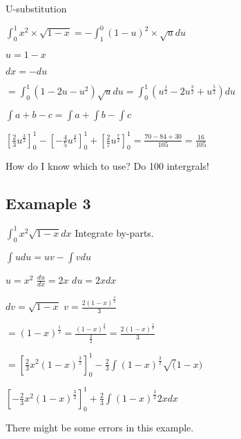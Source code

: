 \documentclass[12pt,a4paper]{article}
\begin{document}
U-substitution

\noindent $\int_{0}^{1} x^2 \times \sqrt{1 - x} = - \int_{1}^{0} (1 - u)^2 \times \sqrt{u} du$

\noindent $\boxed{u = 1 - x}$

\noindent $\boxed{dx = -du}$

\noindent $= \int_{0}^{1} (1-2u-u^2)\sqrt{u} du = \int_{0}^{1} (u^\frac{1}{2} - 2u^\frac{3}{2} + u^\frac{5}{2}) du$

\noindent $\int a + b - c = \int a + \int b - \int c$

\noindent $[\frac{2}{3}u^\frac{3}{2}]_{0}^{1} - [-\frac{4}{5}u^\frac{4}{5}]_{0}^{1} + [\frac{2}{7} u^\frac{7}{2}]_{0}^{1} = \frac{70 - 84 + 30}{105} = \boxed{\frac{16}{105}}$
\newline

\noindent How do I know which to use? Do 100 intergrals!

\newpage

\subsection*{Examaple 3}

$\int_{0}^{1} x^2 \sqrt{1 - x} dx$ Integrate by-parts.

\noindent $\boxed{\int u du = uv - \int v du}$

\noindent $u = x^2$ $\frac{du}{dx} = 2x$ $du = 2xdx$

\noindent $dv = \sqrt{1 - x}$ $v = \frac{2(1-x)^\frac{3}{2}}{3}$

\noindent $=(1-x)^\frac{1}{2} = \frac{(1-x)^\frac{3}{2}}{\frac{3}{2}} = \frac{2(1-x)^\frac{3}{2}}{3}$

\noindent $=[\frac{2}{3} x^2 (1-x)^\frac{3}{2}]_{0}^{1} - \frac{2}{3} \int (1 - x)^\frac{3}{2} \sqrt(1-x)$

\noindent $[-\frac{2}{3} x^2 (1 - x)^\frac{3}{2}]_{0}^{1} + \frac{2}{3} \int (1-x)^\frac{3}{2} 2x dx$
\newline

\noindent There might be some errors in this example.
\end{document}
